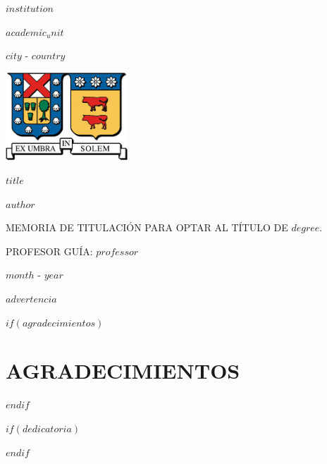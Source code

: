 \documentclass[$if(fontsize)$$fontsize$,$endif$$if(lang)$$lang$,$endif$$if(papersize)$$papersize$,$endif$$for(classoption)$$classoption$$sep$,$endfor$]{$documentclass$}
\begin{document}

    \begin{titlepage}
        \centering
        \bfseries

        \fontsize{18pt}{21.6pt}\selectfont
        \MakeUppercase{$institution$}

        \fontsize{16pt}{19.2pt}\selectfont
        \MakeUppercase{$academic_unit$}

        \fontsize{14pt}{16.8pt}\selectfont
        \MakeUppercase{$city$ - $country$}

        \vspace{1cm}
        \includegraphics[height=33mm]
            {template/Logo_UTFSM_crop.png}

        \vfill

        \fontsize{20pt}{24pt}\selectfont
        \MakeUppercase{$title$}

        \vfill

        \fontsize{14pt}{16.8pt}\selectfont
        \MakeUppercase{$author$}

        \fontsize{12pt}{14.4pt}\selectfont
        \MakeUppercase{
            Memoria de Titulación para optar al título de
            $degree$.
        }

        \fontsize{12pt}{14.4pt}\selectfont
        \MakeUppercase{PROFESOR GUÍA: $professor$}

        \fontsize{14pt}{16.8pt}\selectfont
        \MakeUppercase{$month$ - $year$}
        \par

        \fontsize{14pt}{16.8pt}\selectfont
        $advertencia$
        \par
    \end{titlepage}
    \pagebreak

    $if(agradecimientos)$
        \section*{\centering AGRADECIMIENTOS}
        
        \pagebreak
    $endif$

    $if(dedicatoria)$
        \begin{flushright}
            \itshape
            
        \end{flushright}
        \pagebreak
    $endif$
\end{document}
